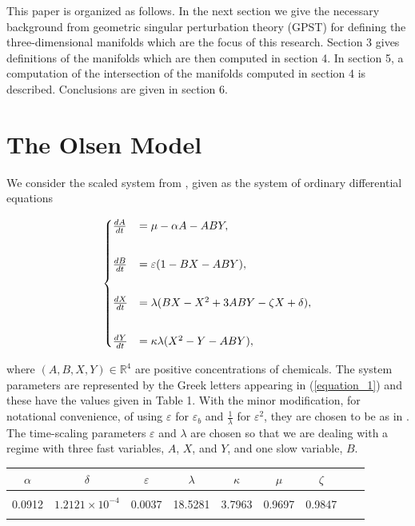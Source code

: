 \documentclass{ws-ijbc}
\begin{document}
This paper is organized as follows.  In the next section we give the necessary background from geometric singular perturbation theory (GPST) for defining the three-dimensional manifolds which are the focus of this research.  Section 3 gives definitions of the manifolds which are then computed in section 4.  In section 5, a computation of the intersection of the manifolds computed in section 4 is described.  Conclusions are given in section 6.

\section{The Olsen Model}

We consider the scaled system from \cite{Rescaling}, given as the system of ordinary differential equations
    
\begin{equation}
\begin{aligned}
\begin{cases}
\frac{dA}{dt} &= \mu - \alpha A - ABY, \\ \vspace{2mm}\\
\frac{dB}{dt} &= \varepsilon(1-BX - ABY), \\ \vspace{2mm}\\
\frac{dX}{dt} &= \lambda(BX - X^2 +3ABY - \zeta X + \delta), \\ \vspace{2mm}\\
\frac{dY}{dt} &= \kappa\lambda(X^2 - Y - ABY),
\end{cases}
\end{aligned}
\label{equation_1}
\end{equation}
    
\noindent
where $(A, B, X, Y)\in\mathbb{R}^{4}$ are positive concentrations of chemicals.  The system parameters are represented by the Greek letters appearing in (\ref{equation_1}) and these have the values given in Table 1.  With the minor modification, for notational convenience, of using $\varepsilon$ for $\varepsilon_{b}$ and $\frac{1}{\lambda}$ for $\varepsilon^{2}$, they are chosen to be as in \cite{Rescaling}.  The time-scaling parameters $\varepsilon$ and $\lambda$ are chosen so that we are dealing with a regime with three fast variables, $A$, $X$, and $Y$, and one slow variable, $B$.

\begin{table}[h]
{\begin{tabular}{c  c  c  c  c  c  c  c  c} \\[-2pt]
\toprule
$\alpha$ & $\delta$ & $\varepsilon$ & $\lambda$ & $\kappa$ & $\mu$ & $\zeta$ \\[6pt]
\hline\\[-2pt]
0.0912 & $1.2121 \times 10^{-4}$ & 0.0037 & 18.5281 & 3.7963 & 0.9697 & 0.9847\\[1pt]
\botrule
\end{tabular}}
\end{table}
    
\end{document}

